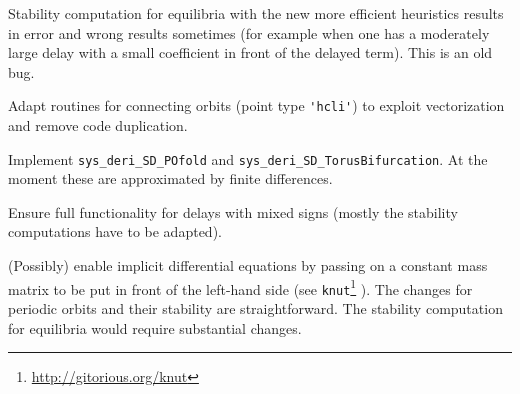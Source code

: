 \documentclass[11pt]{scrartcl}
\newcommand{\blist}[1]{\mbox{\lstinline!#1!}}
\begin{document}
\begin{compactitem}
\item Stability computation for equilibria with the new more efficient
  heuristics results in error and wrong results sometimes (for example
  when one has a moderately large delay with a small coefficient in
  front of the delayed term). This is an old bug.
\item Adapt routines for connecting orbits (point type
  \blist{'hcli'}) to exploit vectorization and remove code duplication.
\item Implement \blist{sys_deri_SD_POfold} and
  \blist{sys_deri_SD_TorusBifurcation}. At the moment these are
  approximated by finite differences.
\item Ensure full functionality for delays with mixed signs (mostly
  the stability computations have to be adapted).
\item (Possibly) enable implicit differential equations by passing on
  a constant mass matrix to be put in front of the left-hand side (see
  \texttt{knut}\footnote{\url{http://gitorious.org/knut}}
  \cite{RS07}). The changes for periodic orbits and their stability
  are straightforward. The stability computation for equilibria would
  require substantial changes.
\end{compactitem}

{\small 
}
\end{document}
